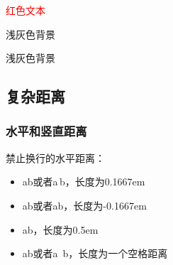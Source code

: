 \documentclass{ctexart}
\begin{document}
            \textcolor{red}{红色文本}

            \colorbox[gray]{.95}{浅灰色背景}



            {\setlength{\fboxrule}{1pt}
            \setlength{\fboxsep}{0pt}
            \colorbox[gray]{.95}{浅灰色背景}

            }

    \subsection{复杂距离}
        \subsubsection{水平和竖直距离}
            禁止换行的水平距离：
            \begin{itemize}
                \item a\thinspace b或者a\,b，长度为0.1667em
                \item a\negthinspace b或者a\!b，长度为-0.1667em
                \item a\enspace b，长度为0.5em
                \item a\nobreakspace b或者a~b，长度为一个空格距离
            \end{itemize}
\end{document}
